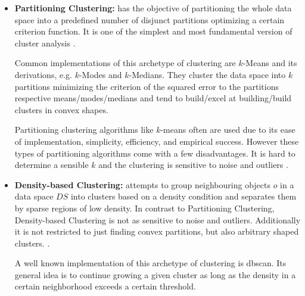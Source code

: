 \begin{itemize}
    \item \textbf{Partitioning Clustering:} has the objective of partitioning the whole data space into a predefined number of disjunct partitions optimizing a certain criterion function. It is one of the simplest and most fundamental version of cluster analysis \cite[Ch.10.2]{han2011data}.
    
    Common implementations of this archetype of clustering are $k$-Means\cite{kmeansmacqueen1967some} and its derivations, e.g. $k$-Modes and $k$-Medians\cite{kmeanshalfcenturysteinley2006k}. They cluster the data space into $k$ partitions minimizing the criterion of the squared error to the partitions respective means/modes/medians and tend to build/excel at building/build clusters in convex shapes\cite{clusteringsurveyberkhin2006survey}. 
    
    Partitioning clustering algorithms like $k$-means often are used due to its ease of implementation, simplicity, efficiency, and empirical success\cite{kmeans50jain2010data}.
    However these types of partitioning algorithms come with a few disadvantages. It is hard to determine a sensible $k$ and the clustering is sensitive to noise and outliers \cite{dataclusteringreviewjain1999data}. 
    
    \item \textbf{Density-based Clustering:} attempts to group neighbouring objects $o$ in a data space $DS$ into clusters based on a density condition and separates them by sparse regions of low density. In contrast to Partitioning Clustering, Density-based Clustering is not as sensitive to noise and outliers. Additionally it is not restricted to just finding convex partitions, but also arbitrary shaped clusters. \cite[Ch.10.4]{han2011data}.
    
    A well known implementation of this archetype of clustering is \acrshort{dbscan}\cite{DBSCANEKSX96}. Its general idea is to continue growing a given cluster as long as the density in a certain neighborhood exceeds a certain threshold. 
    

\end{itemize}
